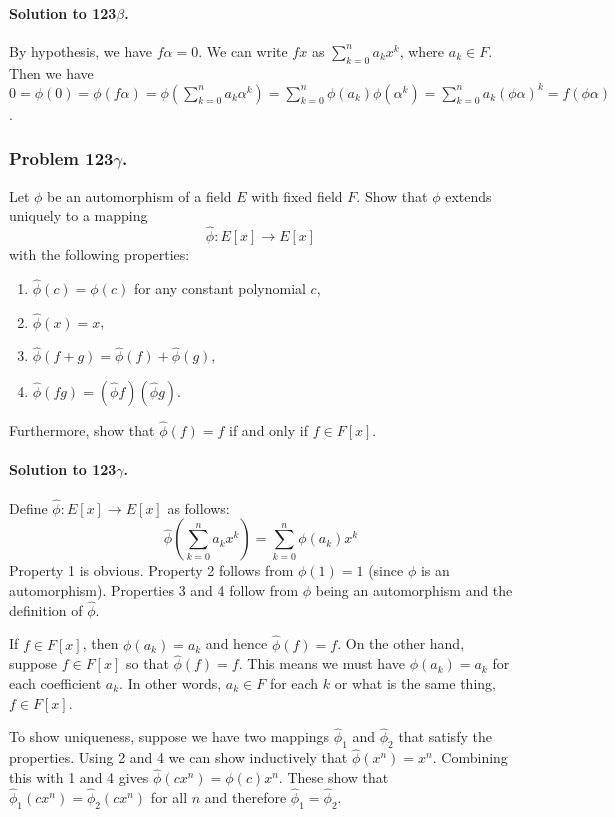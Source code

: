 \paragraph*{Solution to 123$\beta$.}
By hypothesis, we have $f\alpha = 0$. We can write $fx$ as
$\sum_{k=0}^n a_k x^k$, where $a_k \in F$. Then we have
$0 = \phi(0) = \phi(f\alpha) = \phi(\sum_{k=0}^n a_k \alpha^k)
= \sum_{k=0}^n \phi(a_k) \phi(\alpha^k) = \sum_{k=0}^n a_k (\phi\alpha)^k
= f(\phi\alpha)$.

\subsubsection{Problem 123$\gamma$.}
Let $\phi$ be an automorphism of a field $E$ with fixed field $F$. Show that
$\phi$ extends uniquely to a mapping $$\hat{\phi} : E[x] \rightarrow E[x]$$ with the
following properties:
\begin{enumerate}
\item $\hat{\phi}(c) = \phi(c)$ for any constant polynomial $c$,
\item $\hat{\phi}(x) = x$,
\item $\hat{\phi}(f+g) = \hat{\phi}(f) + \hat{\phi}(g)$,
\item $\hat{\phi}(fg) = (\hat{\phi} f)(\hat{\phi} g)$.

\end{enumerate}
Furthermore, show that $\hat{\phi}(f) = f$ if and only if $f \in F[x]$.

\paragraph*{Solution to 123$\gamma$.}
Define $\hat{\phi} : E[x] \rightarrow E[x]$ as follows:
$$ \hat{\phi}\left(\sum_{k=0}^{n} a_k x^k\right) = \sum_{k=0}^{n} \phi(a_k)x^k$$
Property 1 is obvious.
Property 2 follows from $\phi(1) = 1$ (since $\phi$ is an automorphism).
Properties 3 and 4 follow from $\phi$ being an automorphism and the definition
of $\hat{\phi}$.

If $f \in F[x]$, then $\phi(a_k) = a_k$ and hence $\hat{\phi}(f) = f$. On the
other hand, suppose $f \in F[x]$ so that $\hat{\phi}(f) = f$. This means we
must have $\phi(a_k) = a_k$ for each coefficient $a_k$. In other words,
$a_k \in F$ for each $k$ or what is the same thing, $f \in F[x]$.

To show uniqueness, suppose we have two mappings $\hat{\phi}_1$ and $\hat{\phi}_2$
that satisfy the properties.
Using 2 and 4 we can show inductively that $\hat{\phi} (x^n) = x^n$. Combining
this with 1 and 4 gives $\hat{\phi}(c x^n) = \phi(c) x^n$. These show that
$\hat{\phi}_1(c x^n) = \hat{\phi}_2(c x^n)$ for all $n$ and therefore
$\hat{\phi}_1 = \hat{\phi}_2$.

